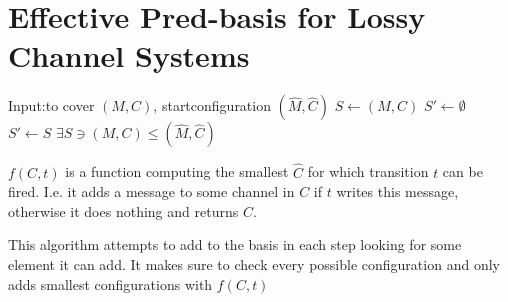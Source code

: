 \section{Effective Pred-basis for Lossy Channel Systems}
\begin{algorithmic}
\STATE Input:to cover $(M,C)$, startconfiguration $(\hat{M},\hat{C})$
\STATE $S \gets (M,C)$
\STATE $S' \gets \emptyset$
	\STATE $S' \gets S$
	\ENDFOR
\ENDWHILE
\RETURN $\exists S \ni (M,C)\leq (\hat{M},\hat{C})$
\end{algorithmic}

$f(C,t)$ is a function computing the smallest $\hat{C}$ for which transition $t$ can be fired. I.e. it adds a message to some channel in $C$ if $t$ writes this message, otherwise it does nothing and returns $C$.

This algorithm attempts to add to the basis in each step looking for some element it can add. It makes sure to check every possible configuration and only adds smallest configurations with $f(C,t)$



